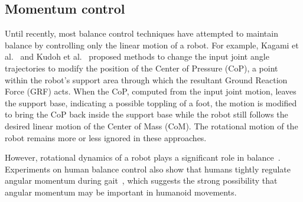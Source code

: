 \documentclass{llncs}
\begin{document}
\subsection{Momentum control}


Until recently, most balance control techniques
have attempted to maintain balance by controlling
only the linear motion of a robot.
For example, Kagami et al.~\cite{Kagami00} and
Kudoh et al.~\cite{Kudoh02} proposed methods to change
the input joint angle trajectories to modify the position of the
Center of Pressure (CoP), a point within the robot's support area through
which the resultant Ground Reaction Force (GRF) acts.
When the CoP, computed from the input joint motion, leaves the
support base, indicating a possible toppling of a foot,
the motion is modified to bring the CoP back inside the
support base while the robot still follows the desired linear
motion of the Center of Mass (CoM). The rotational motion of the
robot remains more or less ignored in these approaches.

However, rotational dynamics of a robot plays a
significant role in balance~\cite{KLKK05}.
Experiments on human balance control also show that
humans tightly regulate angular momentum during gait~\cite{PHH04},
which suggests the strong possibility that angular momentum
may be important in humanoid movements.
\end{document}
